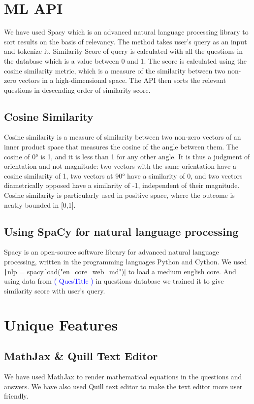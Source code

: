 \documentclass{article}
\begin{document}
\section{ML API}
We have used Spacy which is an advanced natural language processing library to sort results on the basis of relevancy.
The method takes user's query as an input and tokenize it.
Similarity Score of query is calculated with all the questions in the database which is a value between 0 and 1.
The score is calculated using the cosine similarity metric, which is a measure of the similarity between two non-zero vectors in a high-dimensional space.
The API then sorts the relevant questions in descending order of similarity score.
\subsection{Cosine Similarity}
Cosine similarity is a measure of similarity between two non-zero vectors of an inner product space that measures the cosine of the angle between them.
The cosine of 0° is 1, and it is less than 1 for any other angle.
It is thus a judgment of orientation and not magnitude: two vectors with the same orientation have a cosine similarity of 1, two vectors at 90° have a similarity of 0, and two vectors diametrically opposed have a similarity of -1, independent of their magnitude.
Cosine similarity is particularly used in positive space, where the outcome is neatly bounded in [0,1].
\subsection{Using SpaCy for natural language processing}
Spacy is an open-source software library for advanced natural language processing, written in the programming languages Python and Cython. We used \texttt|nlp = spacy.load("en_core_web_md")| to load a medium english core. And using data from \textcolor{blue}{( QuesTitle )} in questions database we trained it to give similarity score with user's query.
\section{Unique Features}
\subsection{MathJax \& Quill Text Editor}
We have used MathJax to render mathematical equations in the questions and answers. We have also used Quill text editor to make the text editor more user friendly.
\end{document}
